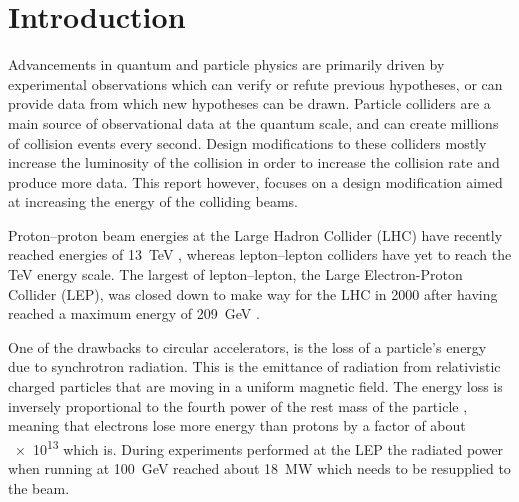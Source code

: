 
\section{Introduction}

Advancements in quantum and particle physics are primarily driven by
experimental observations which can verify or refute previous hypotheses, or can
provide data from which new hypotheses can be drawn.
Particle colliders are a main source of observational data at the quantum scale,
and can create millions of collision events every second.  Design modifications
to these colliders mostly increase the luminosity of the collision in order to
increase the collision rate and produce more data. This report however, focuses
on a design modification aimed at increasing the energy of the colliding beams.


Proton--proton beam energies at the Large Hadron Collider (LHC) have recently
reached energies of \SI{13}{\tera\electronvolt} \cite{CMS:2015bta}, whereas
lepton--lepton colliders have yet to reach the \si{\tera\electronvolt} energy
scale. The largest of lepton--lepton, the Large Electron-Proton Collider (LEP),
was closed down to make way for the LHC in \num{2000} after having reached a
maximum energy of \SI{209}{\giga\electronvolt} \cite{Barate2003sz}.


One of the drawbacks to circular accelerators,
is the loss of a particle's energy due to synchrotron radiation.  This is the
emittance of radiation from relativistic charged particles that are moving in a
uniform magnetic field. The energy loss is inversely proportional to the fourth
power of the rest mass of the particle \cite{sokolov1966synchrotron}, meaning
that electrons lose more energy than protons by a factor of about \num{e13}
which is.  During experiments performed at the LEP the radiated power when
running at \SI{100}{\giga\electronvolt} reached about \SI{18}{\mega\watt} which
needs to be resupplied to the beam.

